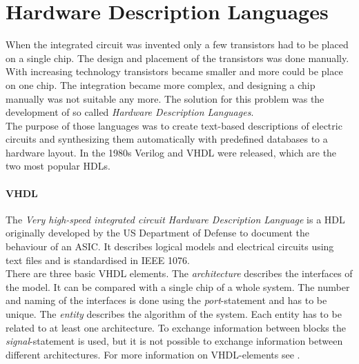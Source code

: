 \chapter{Hardware Description Languages}
\label{kap:HDL}
When the integrated circuit was invented only a few transistors had to be placed on a single chip. The design and placement of the transistors was done manually. With increasing technology transistors became smaller and more could be place on one chip. The integration became more complex, and designing a chip manually was not suitable any more. The solution for this problem was the development of so called \textit{Hardware Description Languages}.\\
The purpose of those languages was to create text-based descriptions of electric circuits and synthesizing them automatically with predefined databases to a hardware layout. In the 1980s Verilog and VHDL were released, which are the two most popular HDLs.
\subsubsection{VHDL}
The \textit{Very high-speed integrated circuit Hardware Description Language} is a HDL originally developed by the US Department of Defense to document the behaviour of an ASIC. It describes logical models and electrical circuits using text files and is standardised in IEEE 1076.\\
There are three basic VHDL elements. The \textit{architecture} describes the interfaces of the model. It can be compared with a single chip of a whole system. The number and naming of the interfaces is done using the \textit{port}-statement and has to be unique. The \textit{entity} describes the algorithm of the system. Each entity has to be related to at least one architecture. To exchange information between blocks the \textit{signal}-statement is used, but it is not possible to exchange information between different architectures. For more information on VHDL-elements see \cite{JuergenReichardt2013}.

\lstset{language=VHDL, tabsize=4}
\begin{center}
\end{center}

